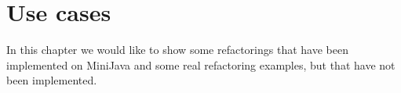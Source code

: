 \section{Use cases}

In this chapter we would like to show some refactorings that have been implemented on MiniJava and some real refactoring examples, but that have not been implemented.





